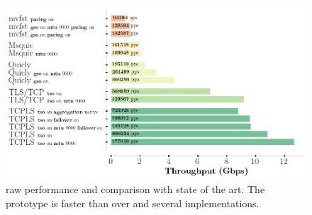 \begin{figure}[!t]
  \begin{center}
    \includegraphics[width=\columnwidth]{figures/perf_analysis.png}
  \end{center}
\vspace{-0.5cm}
  \caption{\tcpls raw performance and comparison with state of the art.  The
    \tcpls prototype is faster than \tls over \tcp and several \quic implementations.}
  \label{fig:perf}
\end{figure}



